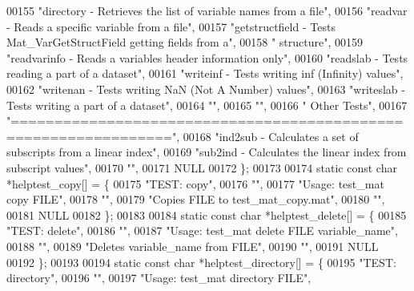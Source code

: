 \begin{DoxyCode}
00155 \textcolor{stringliteral}{"directory               - Retrieves the list of variable names from a file"},
00156 \textcolor{stringliteral}{"readvar                 - Reads a specific variable from a file"},
00157 \textcolor{stringliteral}{"getstructfield          - Tests Mat\_VarGetStructField getting fields from a"},
00158 \textcolor{stringliteral}{"                          structure"},
00159 \textcolor{stringliteral}{"readvarinfo             - Reads a variables header information only"},
00160 \textcolor{stringliteral}{"readslab                - Tests reading a part of a dataset"},
00161 \textcolor{stringliteral}{"writeinf                - Tests writing inf (Infinity) values"},
00162 \textcolor{stringliteral}{"writenan                - Tests writing NaN (Not A Number) values"},
00163 \textcolor{stringliteral}{"writeslab               - Tests writing a part of a dataset"},
00164 \textcolor{stringliteral}{""},
00165 \textcolor{stringliteral}{""},
00166 \textcolor{stringliteral}{"   Other Tests"},
00167 \textcolor{stringliteral}{"================================================================"},
00168 \textcolor{stringliteral}{"ind2sub - Calculates a set of subscripts from a linear index"},
00169 \textcolor{stringliteral}{"sub2ind - Calculates the linear index from subscript values"},
00170 \textcolor{stringliteral}{""},
00171 NULL
00172 \};
00173 
00174 \textcolor{keyword}{static} \textcolor{keyword}{const} \textcolor{keywordtype}{char} *helptest\_copy[] = \{
00175     \textcolor{stringliteral}{"TEST: copy"},
00176     \textcolor{stringliteral}{""},
00177     \textcolor{stringliteral}{"Usage: test\_mat copy FILE"},
00178     \textcolor{stringliteral}{""},
00179     \textcolor{stringliteral}{"Copies FILE to test\_mat\_copy.mat"},
00180     \textcolor{stringliteral}{""},
00181     NULL
00182 \};
00183 
00184 \textcolor{keyword}{static} \textcolor{keyword}{const} \textcolor{keywordtype}{char} *helptest\_delete[] = \{
00185     \textcolor{stringliteral}{"TEST: delete"},
00186     \textcolor{stringliteral}{""},
00187     \textcolor{stringliteral}{"Usage: test\_mat delete FILE variable\_name"},
00188     \textcolor{stringliteral}{""},
00189     \textcolor{stringliteral}{"Deletes variable\_name from FILE"},
00190     \textcolor{stringliteral}{""},
00191     NULL
00192 \};
00193 
00194 \textcolor{keyword}{static} \textcolor{keyword}{const} \textcolor{keywordtype}{char} *helptest\_directory[] = \{
00195     \textcolor{stringliteral}{"TEST: directory"},
00196     \textcolor{stringliteral}{""},
00197     \textcolor{stringliteral}{"Usage: test\_mat directory FILE"},

\end{DoxyCode}
